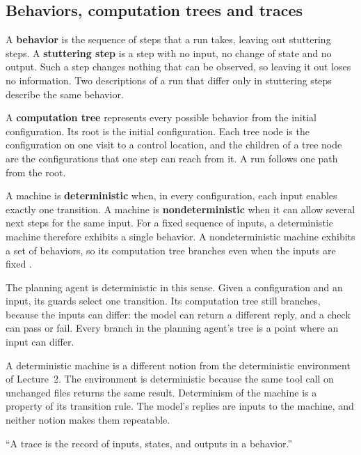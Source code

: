 \subsection{Behaviors, computation trees and traces}
\label{sec:machines-behaviors}

A \textbf{behavior} is the sequence of steps that a run takes, leaving out stuttering steps. A
\textbf{stuttering step} is a step with no input, no change of state and no output. Such a step
changes nothing that can be observed, so leaving it out loses no information. Two descriptions of a
run that differ only in stuttering steps describe the same behavior.

A \textbf{computation tree} represents every possible behavior from the initial configuration. Its
root is the initial configuration. Each tree node is the configuration on one visit to a control
location, and the children of a tree node are the configurations that one step can reach from it. A
run follows one path from the root.

A machine is \textbf{deterministic} when, in every configuration, each input enables exactly one
transition. A machine is \textbf{nondeterministic} when it can allow several next steps for the same
input. For a fixed sequence of inputs, a deterministic machine therefore exhibits a single behavior.
A nondeterministic machine exhibits a set of behaviors, so its computation tree branches even when
the inputs are fixed \citep[slides~29 and~36]{seshia2015discrete}.

The planning agent is deterministic in this sense. Given a configuration and an input, its guards
select one transition. Its computation tree still branches, because the inputs can differ: the model
can return a different reply, and a check can pass or fail. Every branch in the planning agent's tree
is a point where an input can differ.

A deterministic machine is a different notion from the deterministic environment of Lecture~2. The
environment is deterministic because the same tool call on unchanged files returns the same result.
Determinism of the machine is a property of its transition rule. The model's replies are inputs to
the machine, and neither notion makes them repeatable.

\begin{definition}[Trace]
\label{def:machines-trace}
``A trace is the record of inputs, states, and outputs in a behavior.''
\citep[slide~8]{seshia2015extended}
\end{definition}

